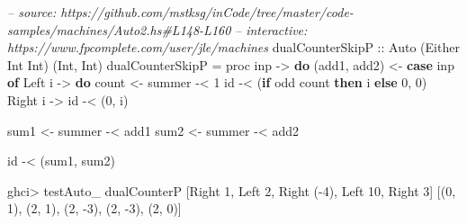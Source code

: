 \documentclass[]{article}
\newenvironment{Shaded}{}{}
\newcommand{\CommentTok}[1]{\textcolor[rgb]{0.38,0.63,0.69}{\textit{#1}}}
\newcommand{\DataTypeTok}[1]{\textcolor[rgb]{0.56,0.13,0.00}{#1}}
\newcommand{\DecValTok}[1]{\textcolor[rgb]{0.25,0.63,0.44}{#1}}
\newcommand{\FunctionTok}[1]{\textcolor[rgb]{0.02,0.16,0.49}{#1}}
\newcommand{\KeywordTok}[1]{\textcolor[rgb]{0.00,0.44,0.13}{\textbf{#1}}}
\newcommand{\NormalTok}[1]{#1}
\newcommand{\OtherTok}[1]{\textcolor[rgb]{0.00,0.44,0.13}{#1}}
\begin{document}
\begin{Shaded}
\begin{Highlighting}[]
\CommentTok{-- source: https://github.com/mstksg/inCode/tree/master/code-samples/machines/Auto2.hs#L148-L160}
\CommentTok{-- interactive: https://www.fpcomplete.com/user/jle/machines}
\OtherTok{dualCounterSkipP ::} \DataTypeTok{Auto}\NormalTok{ (}\DataTypeTok{Either} \DataTypeTok{Int} \DataTypeTok{Int}\NormalTok{) (}\DataTypeTok{Int}\NormalTok{, }\DataTypeTok{Int}\NormalTok{)}
\NormalTok{dualCounterSkipP }\FunctionTok{=}\NormalTok{ proc inp }\OtherTok{->} \KeywordTok{do}
\NormalTok{    (add1, add2) }\OtherTok{<-} \KeywordTok{case}\NormalTok{ inp }\KeywordTok{of}
                      \DataTypeTok{Left}\NormalTok{ i }\OtherTok{->} \KeywordTok{do}
\NormalTok{                        count }\OtherTok{<-}\NormalTok{ summer }\FunctionTok{-<} \DecValTok{1}
\NormalTok{                        id }\FunctionTok{-<}\NormalTok{ (}\KeywordTok{if}\NormalTok{ odd count }\KeywordTok{then}\NormalTok{ i }\KeywordTok{else} \DecValTok{0}\NormalTok{, }\DecValTok{0}\NormalTok{)}
                      \DataTypeTok{Right}\NormalTok{ i }\OtherTok{->}
\NormalTok{                        id }\FunctionTok{-<}\NormalTok{ (}\DecValTok{0}\NormalTok{, i)}

\NormalTok{    sum1 }\OtherTok{<-}\NormalTok{ summer }\FunctionTok{-<}\NormalTok{ add1}
\NormalTok{    sum2 }\OtherTok{<-}\NormalTok{ summer }\FunctionTok{-<}\NormalTok{ add2}

\NormalTok{    id }\FunctionTok{-<}\NormalTok{ (sum1, sum2)}
\end{Highlighting}
\end{Shaded}

\begin{Shaded}
\begin{Highlighting}[]
\NormalTok{ghci}\FunctionTok{>}\NormalTok{ testAuto_ dualCounterP [}\DataTypeTok{Right} \DecValTok{1}\NormalTok{, }\DataTypeTok{Left} \DecValTok{2}\NormalTok{, }\DataTypeTok{Right}\NormalTok{ (}\FunctionTok{-}\DecValTok{4}\NormalTok{), }\DataTypeTok{Left} \DecValTok{10}\NormalTok{, }\DataTypeTok{Right} \DecValTok{3}\NormalTok{]}
\NormalTok{[(}\DecValTok{0}\NormalTok{, }\DecValTok{1}\NormalTok{), (}\DecValTok{2}\NormalTok{, }\DecValTok{1}\NormalTok{), (}\DecValTok{2}\NormalTok{, }\FunctionTok{-}\DecValTok{3}\NormalTok{), (}\DecValTok{2}\NormalTok{, }\FunctionTok{-}\DecValTok{3}\NormalTok{), (}\DecValTok{2}\NormalTok{, }\DecValTok{0}\NormalTok{)]}
\end{Highlighting}
\end{Shaded}
\end{document}
